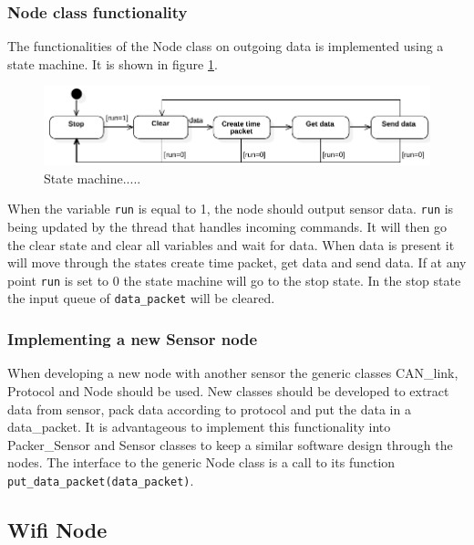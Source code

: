 \subsubsection*{Node class functionality}
The functionalities of the Node class on outgoing data is implemented using a state machine.
It is shown in figure \ref{fig:state_machine}.
\begin{figure}[!h]
\centering
\includegraphics[width=1\textwidth]{graphics/StateDiagram_Node.pdf}
\caption{State machine.....}
\label{fig:state_machine}
\end{figure}
When the variable \texttt{run} is equal to 1, the node should output sensor data.
\texttt{run} is being updated by the thread that handles incoming commands.
It will then go the clear state and clear all variables and wait for data. 
When data is present it will move through the states create time packet, get data and send data. 
If at any point \texttt{run} is set to 0 the state machine will go to the stop state.
In the stop state the input queue of \texttt{data\_packet} will be cleared.

\subsubsection*{Implementing a new Sensor node}
When developing a new node with another sensor the generic classes CAN\_link, Protocol and Node should be used. 
New classes should be developed to extract data from sensor, pack data according to protocol and put the data in a data\_packet.
It is advantageous to implement this functionality into Packer\_Sensor and Sensor classes to keep a similar software design through the nodes.
The interface to the generic Node class is a call to its function \texttt{put\_data\_packet(data\_packet)}.

\subsection{Wifi Node}

